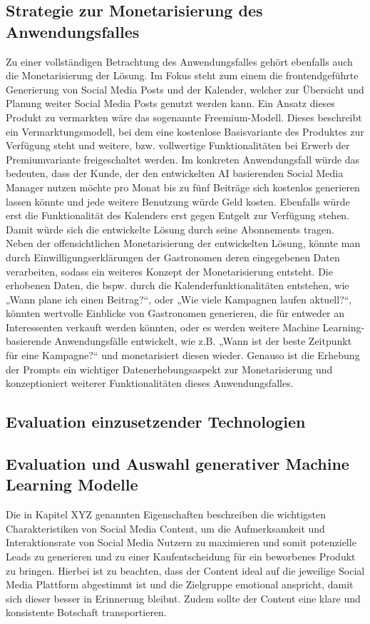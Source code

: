 \subsection{Strategie zur Monetarisierung des Anwendungsfalles}
Zu einer vollständigen Betrachtung des Anwendungsfalles gehört ebenfalls auch die Monetarisierung der Lösung.
Im Fokus steht zum einem die frontendgeführte Generierung von Social Media Posts und der Kalender, welcher zur Übersicht und Planung weiter Social Media Posts genutzt werden kann.
Ein Ansatz dieses Produkt zu vermarkten wäre das sogenannte Freemium-Modell.
Dieses beschreibt ein Vermarktungsmodell, bei dem eine kostenlose Basisvariante des Produktes zur Verfügung steht und weitere, bzw. vollwertige Funktionalitäten bei Erwerb der Premiumvariante freigeschaltet werden.
Im konkreten Anwendungsfall würde das bedeuten, dass der Kunde, der den entwickelten AI basierenden Social Media Manager nutzen möchte pro Monat bis zu fünf Beiträge sich kostenlos generieren lassen könnte und jede weitere Benutzung würde Geld kosten.
Ebenfalls würde erst die Funktionalität des Kalenders erst gegen Entgelt zur Verfügung stehen.
Damit würde sich die entwickelte Lösung durch seine Abonnements tragen.
Neben der offensichtlichen Monetarisierung der entwickelten Lösung, könnte man durch Einwilligungserklärungen der Gastronomen deren eingegebenen Daten verarbeiten, sodass ein weiteres Konzept der Monetarisierung entsteht.
Die erhobenen Daten, die bspw. durch die Kalenderfunktionalitäten entstehen, wie „Wann plane ich einen Beitrag?“, oder „Wie viele Kampagnen laufen aktuell?“, könnten wertvolle Einblicke von Gastronomen generieren, die für entweder an Interessenten verkauft werden könnten, oder es werden weitere Machine Learning-basierende Anwendungsfälle entwickelt, wie z.B. „Wann ist der beste Zeitpunkt für eine Kampagne?“ und monetarisiert diesen wieder.
Genauso ist die Erhebung der Prompts ein wichtiger Datenerhebungsaspekt zur Monetarisierung und konzeptioniert weiterer Funktionalitäten dieses Anwendungsfalles.


\subsection{Evaluation einzusetzender Technologien}

\subsection{Evaluation und Auswahl generativer Machine Learning Modelle}
Die in Kapitel XYZ genannten Eigenschaften beschreiben die wichtigsten Charakteristiken von Social Media Content, um die Aufmerksamkeit und Interaktionsrate von Social Media Nutzern zu maximieren und somit potenzielle Leads zu generieren und zu einer Kaufentscheidung für ein beworbenes Produkt zu bringen.
Hierbei ist zu beachten, dass der Content ideal auf die jeweilige Social Media Plattform abgestimmt ist und die Zielgruppe emotional anspricht, damit sich dieser besser in Erinnerung bleibnt.
Zudem sollte der Content eine klare und konsistente Botschaft transportieren.

